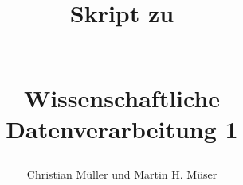 \documentclass[12pt, a4paper]{scrreprt}
\begin{document}
\begin{titlepage}
\title{\begin{large}Skript zu\end{large}         \\
        Wissenschaftliche Datenverarbeitung 1 }
\author{Christian Müller und Martin H. Müser}
\maketitle
\end{titlepage}



\setcounter{chapter}{-1}
\tableofcontents









\end{document}
